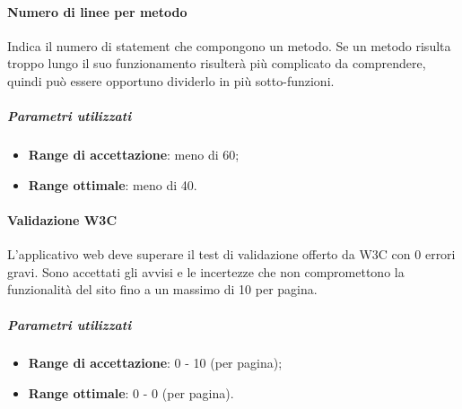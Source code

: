 \documentclass[../PianoDiQualifica.tex]{subfiles}
\begin{document}
					\paragraph{Numero di linee per metodo}
					Indica il numero di statement che compongono un metodo. Se un metodo risulta troppo lungo il suo funzionamento risulterà più complicato da comprendere, quindi può essere opportuno dividerlo in più sotto-funzioni.
					\subparagraph{Parametri utilizzati}
					\begin{itemize}
						\item \textbf{Range di accettazione}: meno di 60;
						\item \textbf{Range ottimale}: meno di 40.
					\end{itemize}
					
					\paragraph{Validazione W3C}
					L'applicativo web deve superare il test di validazione offerto da W3C con 0 errori gravi.
					Sono accettati gli avvisi e le incertezze che non compromettono la funzionalità del sito fino a un massimo di 10 per pagina.
					\subparagraph{Parametri utilizzati}
					\begin{itemize}
						\item \textbf{Range di accettazione}: 0 - 10 (per pagina);
						\item \textbf{Range ottimale}: 0 - 0 (per pagina).
					\end{itemize}	
\end{document}
